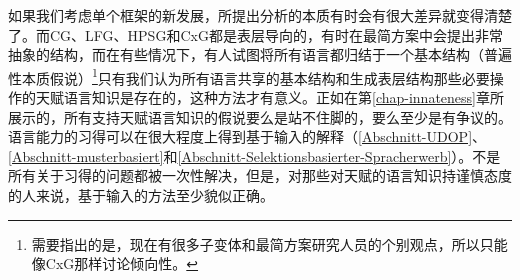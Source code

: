 如果我们考虑单个框架的新发展，所提出分析的本质有时会有很大差异就变得清楚了。而CG、LFG、HPSG和CxG都是表层导向的，有时在最简方案中会提出非常抽象的结构，而在有些情况下，有人试图将所有语言都归结于一个基本结构（普遍性本质假说）\footnote{%
需要指出的是，现在有很多子变体和最简方案研究人员的个别观点，所以只能像CxG那样讨论倾向性。
}只有我们认为所有语言共享的基本结构和生成表层结构那些必要操作的天赋语言知识是存在的，这种方法才有意义。正如在第\ref{chap-innateness}章所展示的，所有支持天赋语言知识的假说要么是站不住脚的，要么至少是有争议的。语言能力的习得可以在很大程度上得到基于输入的解释（\ref{Abschnitt-UDOP}、\ref{Abschnitt-musterbasiert}和\ref{Abschnitt-Selektionsbasierter-Spracherwerb}）。不是所有关于习得的问题都被一次性解决，但是，对那些对天赋的语言知识持谨慎态度的人来说，基于输入的方法至少貌似正确。

